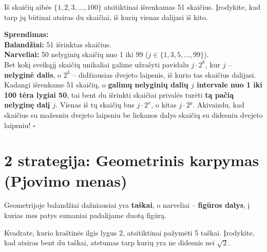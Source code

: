 \documentclass[11pt,a4paper]{scrartcl}
\newenvironment{solution}
    {\begin{list}{}{\setlength{\leftmargin}{10pt}\setlength{\rightmargin}{10pt}}\item[]}
    {\end{list}}
\begin{document}
\begin{example}
Iš skaičių aibės $\{1, 2, 3, \dots, 100\}$ atsitiktinai išrenkamas 51 skaičius. Įrodykite, kad tarp jų būtinai atsiras du skaičiai, iš kurių vienas dalijasi iš kito.
\end{example}

\begin{solution}
\textbf{Sprendimas:} \\
\textbf{Balandžiai:} 51 išrinktas skaičius.\\
\textbf{Narveliai:} 50 nelyginių skaičių nuo 1 iki 99 ($j \in \{1, 3, 5, \dots, 99\}$).\\

Bet kokį sveikąjį skaičių unikaliai galime užrašyti pavidalu $j \cdot 2^k$, kur $j$ – \textbf{nelyginė dalis}, o $2^k$ – didžiausias dvejeto laipsnis, iš kurio tas skaičius dalijasi. 
Kadangi išrenkame 51 skaičių, o \textbf{galimų nelyginių dalių $j$ intervale nuo 1 iki 100 tėra lygiai 50}, tai bent du išrinkti skaičiai privalės turėti \textbf{tą pačią nelyginę dalį $j$}. 
Vienas iš tų skaičių bus $j \cdot 2^x$, o kitas $j \cdot 2^y$. Akivaizdu, kad skaičius su mažesniu dvejeto laipsniu be liekanos dalys skaičių su didesniu dvejeto laipsniu! \hfill $\square$
\end{solution}

\section{2 strategija: Geometrinis karpymas (Pjovimo menas)}

Geometrijoje balandžiai dažniausiai yra \textbf{taškai}, o narveliai – \textbf{figūros dalys}, į kurias mes patys sumaniai padalijame duotą figūrą. 

\begin{example}
Kvadrate, kurio kraštinės ilgis lygus 2, atsitiktinai pažymėti 5 taškai. Įrodykite, kad atsiras bent du taškai, atstumas tarp kurių yra ne didesnis nei $\sqrt{2}$.
\end{example}
\end{document}
